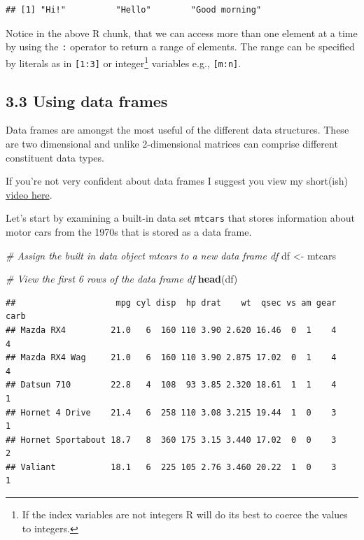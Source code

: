 \documentclass[
]{article}
\newenvironment{Shaded}{\begin{snugshade}}{\end{snugshade}}
\newcommand{\CommentTok}[1]{\textcolor[rgb]{0.56,0.35,0.01}{\textit{#1}}}
\newcommand{\FunctionTok}[1]{\textcolor[rgb]{0.13,0.29,0.53}{\textbf{#1}}}
\newcommand{\NormalTok}[1]{#1}
\newcommand{\OtherTok}[1]{\textcolor[rgb]{0.56,0.35,0.01}{#1}}
\begin{document}
\begin{verbatim}
## [1] "Hi!"          "Hello"        "Good morning"
\end{verbatim}

Notice in the above R chunk, that we can access more than one element at
a time by using the \texttt{:} operator to return a range of elements.
The range can be specified by literals as in \texttt{{[}1:3{]}} or
integer\footnote{If the index variables are not integers R will do its
  best to coerce the values to integers.} variables e.g.,
\texttt{{[}m:n{]}}.

\subsection{3.3 Using data frames}\label{using-data-frames}

Data frames are amongst the most useful of the different data
structures. These are two dimensional and unlike 2-dimensional matrices
can comprise different constituent data types.

If you're not very confident about data frames I suggest you view my
short(ish)
\href{https://www.loom.com/share/f57102f824e948d2b357f1909ad070a1}{video
here}.

Let's start by examining a built-in data set \texttt{mtcars} that stores
information about motor cars from the 1970s that is stored as a data
frame.

\begin{Shaded}
\begin{Highlighting}[]
\CommentTok{\# Assign the built in data object mtcars to a new data frame df}
\NormalTok{df }\OtherTok{\textless{}{-}}\NormalTok{ mtcars}

\CommentTok{\# View the first 6 rows of the data frame df}
\FunctionTok{head}\NormalTok{(df)}
\end{Highlighting}
\end{Shaded}

\begin{verbatim}
##                    mpg cyl disp  hp drat    wt  qsec vs am gear carb
## Mazda RX4         21.0   6  160 110 3.90 2.620 16.46  0  1    4    4
## Mazda RX4 Wag     21.0   6  160 110 3.90 2.875 17.02  0  1    4    4
## Datsun 710        22.8   4  108  93 3.85 2.320 18.61  1  1    4    1
## Hornet 4 Drive    21.4   6  258 110 3.08 3.215 19.44  1  0    3    1
## Hornet Sportabout 18.7   8  360 175 3.15 3.440 17.02  0  0    3    2
## Valiant           18.1   6  225 105 2.76 3.460 20.22  1  0    3    1
\end{verbatim}
\end{document}
